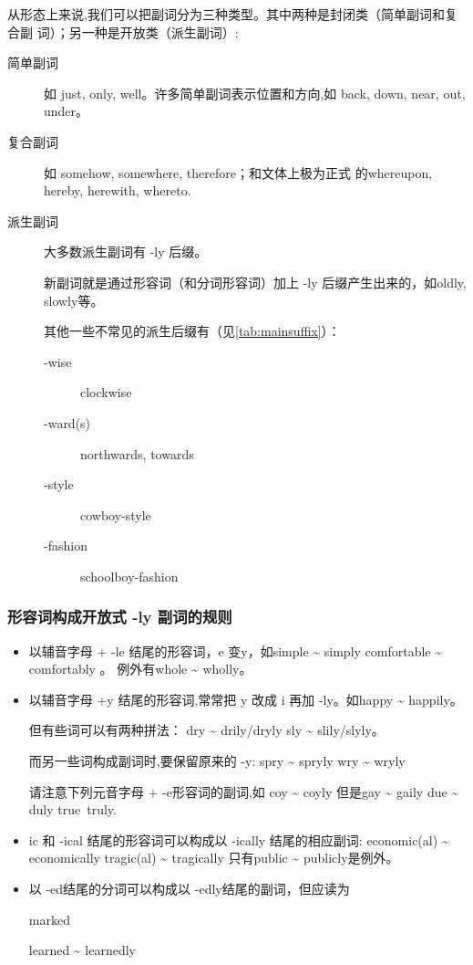从形态上来说,我们可以把副词分为三种类型。其中两种是封闭类（简单副词和复合副
词）；另一种是开放类（派生副词）:
\begin{description}
\item[简单副词] 如 just, only, well。许多简单副词表示位置和方向,如 back, down,
  near, out, under。

\item[复合副词] 如 somehow, somewhere, therefore；和文体上极为正式
  的whereupon, hereby, herewith, whereto.

\item[派生副词] 大多数派生副词有 -ly 后缀。

  新副词就是通过形容词（和分词形容词）加上 -ly 后缀产生出来的，如oldly,
  slowly等。

  其他一些不常见的派生后缀有（见\cref{tab:mainsuffix}）：
  \begin{description}
  \item[-wise] clockwise
  \item[-ward(s)] northwards, towards
  \item[-style] cowboy-style
  \item[-fashion] schoolboy-fashion
  \end{description}

\end{description}

\subsubsection{形容词构成开放式 -ly 副词的规则}
\begin{itemize}
\item 以辅音字母 + -le 结尾的形容词，e 变y，如simple \~{} simply \qquad comfortable
  \~{} comfortably 。 例外有whole \~{} wholly。

\item 以辅音字母 +y 结尾的形容词,常常把 y 改成 i 再加 -ly。如happy \~{} happily。

  但有些词可以有两种拼法： dry \~{} drily/dryly \qquad sly \~{} slily/slyly。

  而另一些词构成副词时,要保留原来的 -y: spry \~{} spryly \qquad wry \~{} wryly

  请注意下列元音字母 + -e形容词的副词,如 coy \~{} coyly 但是gay \~{} gaily
  \qquad due \~{} duly \qquad true~truly.

\item ic 和 -ical 结尾的形容词可以构成以 -ically 结尾的相应副词:
  economic(al) \~{} economically \qquad tragic(al) \~{} tragically
  只有public \~{} publicly是例外。

\item 以 -ed结尾的分词可以构成以 -edly结尾的副词，但应读为

  marked  \qquad {}

  learned  \~{} learnedly 
\end{itemize}

